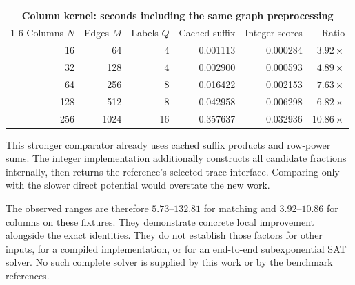 \begin{center}
\begin{tabular}{@{}rrrrrr@{}}
\toprule
\multicolumn{6}{c}{Column kernel: seconds including the same graph preprocessing}\\
\cmidrule(lr){1-6}
Columns $N$ & Edges $M$ & Labels $Q$ & Cached suffix & Integer scores & Ratio\\
\midrule
16  & 64   & 4  & 0.001113 & 0.000284 & $3.92\times$\\
32  & 128  & 4  & 0.002900 & 0.000593 & $4.89\times$\\
64  & 256  & 8  & 0.016422 & 0.002153 & $7.63\times$\\
128 & 512  & 8  & 0.042958 & 0.006298 & $6.82\times$\\
256 & 1024 & 16 & 0.357637 & 0.032936 & $10.86\times$\\
\bottomrule
\end{tabular}
\end{center}
This stronger comparator already uses cached suffix products and row-power
sums. The integer implementation additionally constructs all candidate
fractions internally, then returns the reference's selected-trace interface.
Comparing only with the slower direct potential would overstate the new work.

The observed ranges are therefore $5.73$--$132.81$ for matching and
$3.92$--$10.86$ for columns on these fixtures. They demonstrate concrete local
improvement alongside the exact identities. They do not establish those
factors for other inputs, for a compiled implementation, or for an end-to-end
subexponential SAT solver. No such complete solver is supplied by this work
or by the benchmark references.
